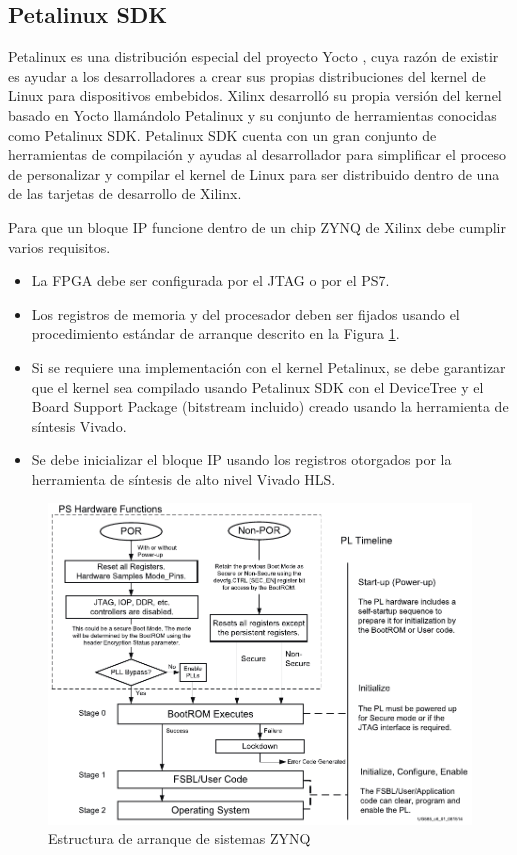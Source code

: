 \subsection{Petalinux SDK}

Petalinux es una distribución especial del proyecto Yocto \citep{Yocto}, cuya razón de existir es ayudar a los desarrolladores a crear sus propias distribuciones del kernel de Linux para dispositivos embebidos. Xilinx desarrolló su propia versión del kernel basado en Yocto llamándolo Petalinux y su conjunto de herramientas conocidas como Petalinux SDK. Petalinux SDK cuenta con un gran conjunto de herramientas de compilación y ayudas al desarrollador para simplificar el proceso de personalizar y compilar el kernel de Linux para ser distribuido dentro de una de las tarjetas de desarrollo de Xilinx.

Para que un bloque IP funcione dentro de un chip ZYNQ de Xilinx debe cumplir varios requisitos.

\begin{itemize}
\item La FPGA debe ser configurada por el JTAG o por el PS7.
\item Los registros de memoria y del procesador deben ser fijados usando el procedimiento estándar de arranque descrito en la Figura \ref{fig:arranqueFPGA}.
\item Si se requiere una implementación con el kernel Petalinux, se debe garantizar que el kernel sea compilado usando Petalinux SDK con el DeviceTree y el Board Support Package (bitstream incluido) creado usando la herramienta de síntesis Vivado.
\item Se debe inicializar el bloque IP usando los registros otorgados por la herramienta de síntesis de alto nivel Vivado HLS.
\end{itemize}

\begin{figure}[H]
	\centering
		\includegraphics[scale=0.8]{./Figures/I3.pdf}
	\caption{Estructura de arranque de sistemas ZYNQ \citep{TRM2017}}
	\label{fig:arranqueFPGA}
\end{figure}

